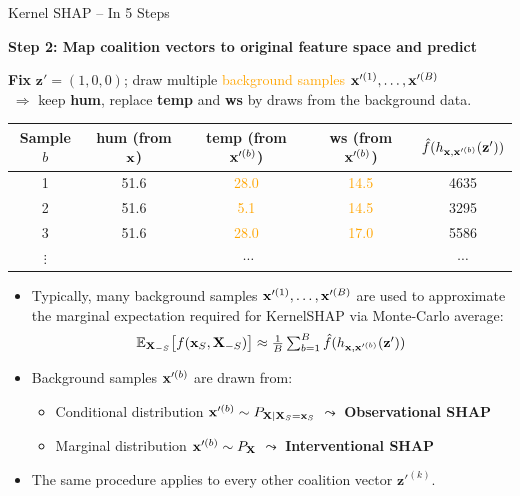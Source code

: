 \documentclass[10pt,compress,t,notes=noshow, xcolor=table]{beamer}
\begin{document}
\begin{frame}{Kernel SHAP – In 5 Steps}

\textbf{Step 2: Map coalition vectors to original feature space and predict}

\medskip

\textbf{Fix} \(\mathbf{z}'=(1,0,0)\); draw multiple \textcolor{orange}{background samples $\mathbf{x}'^{(1)}, \dots, \mathbf{x}'^{(B)}$}\\
\(\;\Rightarrow\) keep \textbf{hum}, replace \textbf{temp} and \textbf{ws} by draws from the background data.

\begin{table}\centering\small
\begin{tabular}{c|ccc|c}
Sample \(b\) & hum (from \(\mathbf{x}\)) & temp (from $\mathbf{x}'^{(b)}$) & ws (from $\mathbf{x}'^{(b)}$)  & \(\hat{f}(h_{\mathbf{x}, \mathbf{x}'^{(b)}}(\mathbf{z}'))\) \\
\hline
1 & 51.6 & \textcolor{orange}{28.0} & \textcolor{orange}{14.5} & 4635 \\
2 & 51.6 & \textcolor{orange}{5.1} & \textcolor{orange}{14.5} & 3295 \\
3 & 51.6 & \textcolor{orange}{28.0} & \textcolor{orange}{17.0} & 5586 \\
$\vdots$ & \multicolumn{3}{c}{$\cdots$} & $\cdots$ \\
\end{tabular}
\end{table}


\begin{itemize}
  \item Typically, many background samples $\mathbf{x}'^{(1)}, \dots, \mathbf{x}'^{(B)}$ are used to approximate the marginal expectation required for KernelSHAP via Monte-Carlo average:
  $$ \textstyle \mathbb{E}_{\mathbf{X}_{-S}}\bigl[f(\mathbf{x}_S,\mathbf{X}_{-S})\bigr] \approx
\frac{1}{B}\sum_{b=1}^{B}\hat{f}(h_{\mathbf{x}, \mathbf{x}'^{(b)}}(\mathbf{z}'))$$
\item Background samples \( \mathbf{x}'^{(b)} \) are drawn from:
\begin{itemize}
  \item Conditional distribution \( \mathbf{x}'^{(b)} \sim P_{\mathbf{X} \mid \mathbf{X}_S = \mathbf{x}_S} \) $\leadsto$ \textbf{Observational SHAP} 
  \item Marginal distribution \( \mathbf{x}'^{(b)} \sim P_{\mathbf{X}} \) $\leadsto$  \textbf{Interventional SHAP}
\end{itemize}

\item The same procedure applies to every other coalition vector \(\mathbf{z}'^{(k)}\).
\end{itemize}

\end{frame}
\end{document}
